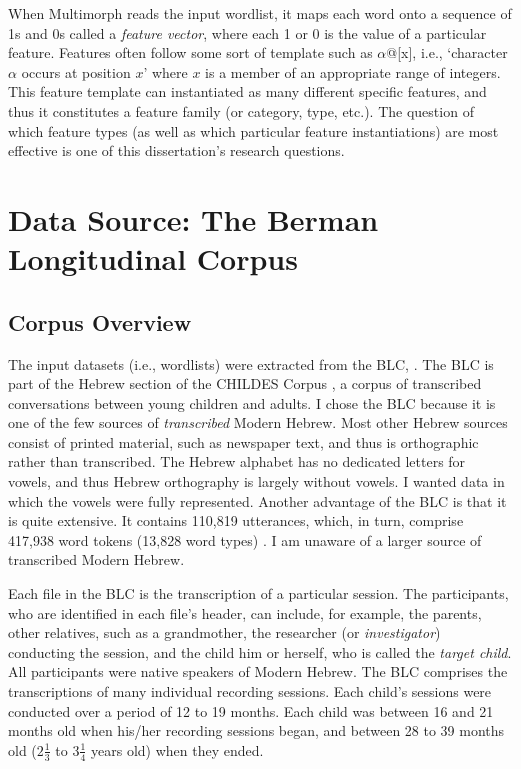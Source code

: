When Multimorph reads the input wordlist, 
it maps each word onto
a sequence of 1s and 0s called a \emph{feature vector}, 
where each 1 or 0 is the value of a
particular feature. 
Features often follow some sort of template such as $\alpha$@[x], i.e., `character $\alpha$ occurs at position $x$' where $x$ is a member of an appropriate range of integers. This feature template can instantiated as many different specific features, and thus it constitutes a feature family (or category, type, etc.). The question of which feature types (as well as which particular feature instantiations) are most effective is one of this dissertation's research questions. 

\section{Data Source: The Berman Longitudinal Corpus}
\label{sec:datasource}
\subsection{Corpus Overview}
\label{sec:corpus-overview}
The input datasets (i.e., wordlists) were extracted 
from the BLC, \citep{berman-weissenborn:1991}. 
The BLC is part of the Hebrew section of the 
CHILDES Corpus \citep{macwhinney:2000a}, a corpus 
of transcribed conversations between young children 
and adults. I chose the BLC because 
it is one of the few sources of \emph{transcribed} Modern Hebrew. 
Most other Hebrew sources consist of printed material, 
such as newspaper text, and thus is orthographic 
rather than transcribed. The Hebrew alphabet has no 
dedicated letters for vowels, and thus Hebrew 
orthography is largely without vowels. I wanted data in which the vowels were 
fully represented. Another advantage of the BLC is that 
it is quite extensive. It contains 110,819 utterances, which, in turn, comprise 417,938 word tokens (13,828 word types) \citep{albert-et-al:2012}.
I am unaware of a larger source of 
transcribed Modern Hebrew. 

Each file in the BLC is the transcription of a 
particular session. The participants, who are identified 
in each file's header, can include, for example, the parents,
 other relatives, such as a grandmother, 
the researcher (or \emph{investigator}) conducting the 
session, and the child him or herself, 
who is called the \emph{target child}. All participants 
were native speakers of Modern Hebrew. The BLC comprises 
the transcriptions of many individual recording sessions. 
Each child's sessions were conducted over a period of 
12 to 19 months. Each child was between 16 and 21 months 
old when his/her recording sessions began, and between 
28 to 39 months old ($2\frac{1}{3}$ to $3\frac{1}{4}$ 
years old) when they ended.

